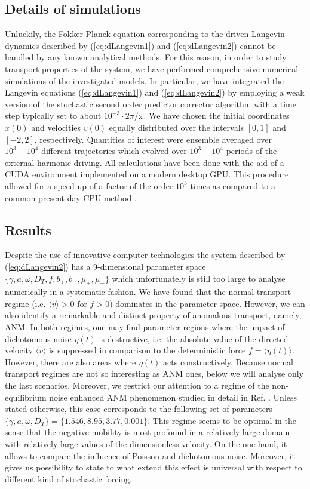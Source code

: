 \documentclass[12pt]{iopart}
\begin{document}
\subsection{Details of simulations}
Unluckily, the Fokker-Planck equation corresponding to the driven Langevin dynamics described by (\ref{eq:dLangevin1}) and (\ref{eq:dLangevin2}) cannot be handled by any known analytical methods. For this reason, in order to study transport properties of the system,  we have performed comprehensive numerical simulations of the investigated models. In particular, we have integrated the Langevin equations (\ref{eq:dLangevin1}) and (\ref{eq:dLangevin2}) by employing a weak version of the stochastic second order predictor corrector algorithm with a time step typically set to about $10^{-3} \cdot 2\pi/\omega$. We have chosen the initial coordinates $x(0)$ and velocities $v(0)$ equally distributed over the intervals $[0,1]$ and $[-2,2]$, respectively. Quantities of interest were ensemble averaged over $10^3 - 10^4$ different trajectories which evolved over $10^3 - 10^4$ periods of the external harmonic driving. All calculations have been done with the aid of a CUDA environment implemented on a modern desktop GPU. This procedure allowed for a speed-up of a factor of the order $10^{3}$ times as compared to a common present-day CPU method \cite{spiechCPC}.

\subsection{Results}
Despite the use of innovative computer technologies the system described by (\ref{eq:dLangevin2}) has a 9-dimensional parameter space $\{\gamma, a, \omega, D_T, f, b_+, b_-, \mu_+, \mu_-\}$ which unfortunately is still too large to analyse numerically in a systematic fashion. We have found that the normal transport regime (i.e. $\langle v\rangle >0$ for $f>0$)  dominates in the parameter space. However, we can also identify a remarkable and distinct property of anomalous transport, namely, ANM. In both regimes, one may find parameter regions where the impact of dichotomous noise $\eta(t)$ is destructive, i.e. the absolute value of the directed velocity $\langle v\rangle$ is suppressed in comparison to the deterministic force $f = \langle \eta(t)\rangle$. However, there are also areas where $\eta(t)$ acts constructively. Because normal transport regimes are not so interesting as ANM ones, below we will analyse only the last scenarios. Moreover, we restrict our attention to a regime of the non-equilibrium noise enhanced ANM phenomenon studied in detail in Ref. \cite{spiechPRE}. Unless stated otherwise, this case corresponds to the following set of parameters $\{\gamma, a, \omega, D_T\} = \{1.546, 8.95, 3.77, 0.001\}$. This regime seems to be optimal in the sense that the negative mobility is most profound in a relatively large domain with relatively large values of the dimensionless velocity. On the one hand, it allows to compare the influence of Poisson and dichotomous noise. Moreover, it gives us possibility to state to what extend this effect is universal with respect to different kind of stochastic forcing.
\end{document}
